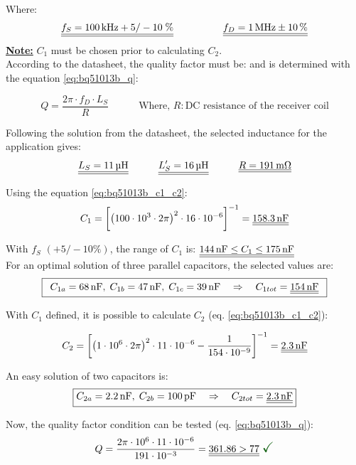 \documentclass[report.tex]{subfiles}
\begin{document}
Where:
$$
\begin{array}{l c r}
\underline{\underline{f_S= \SI{100}{\kilo\hertz} +5/-10 \; \si{\percent}}} & \quad \quad \quad & \underline{\underline{f_D = \SI{1}{\mega\hertz} \pm \SI{10}{\percent}}}
\end{array}
$$
\textbf{\underline{Note:}} $C_1$ must be chosen prior to calculating $C_2$.\\

According to the datasheet, the quality factor must be:  and is determined with the equation \ref{eq:bq51013b_q}:

\begin{equation}
\label{eq:bq51013b_q}
\boxed{Q = \dfrac{2 \pi \cdot f_D \cdot L_S}{R}}\quad \quad \quad \text{Where, } R:\text{DC resistance of the receiver coil}
\end{equation}

Following the solution from the datasheet, the selected inductance for the application gives:
$$
\ddl{L_S = \SI{11}{\micro\henry}} \quad\quad\quad \ddl{L_S' = \SI{16}{\micro\henry}} \quad\quad\quad \ddl{R = \SI{191}{\milli\ohm}}
$$

Using the equation \ref{eq:bq51013b_c1_c2}:
$$
C_1 = \bigg[ \big( 100\cdot 10^3 \cdot 2\pi \big)^2 \cdot 16\cdot 10^{-6} \bigg]^{-1} = \underline{\underline{\SI{158.3}{\nano\farad}}}
$$

With $f_S$ $(+5/-10\si{\percent})$, the range of $C_1$ is: $\underline{\underline{\SI{144}{\nano\farad}\leq C_1 \leq \SI{175}{\nano\farad}}}$\\

For an optimal solution of three parallel capacitors, the selected values are:
$$
\boxed{
\begin{array}{c}
C_{1a} = \SI{68}{\nano\farad}, \; C_{1b} = \SI{47}{\nano\farad}, \; C_{1c} = \SI{39}{\nano\farad} \quad \Rightarrow \quad C_{1tot} = \underline{\underline{\SI{154}{\nano\farad}}}
\end{array}}
$$

With $C_1$ defined, it is possible to calculate $C_2$ (eq. \ref{eq:bq51013b_c1_c2}):

$$
C_2 = \bigg[ \big( 1\cdot 10^6 \cdot 2\pi \big)^2 \cdot 11\cdot 10^{-6} - \dfrac{1}{154\cdot 10^{-9}} \bigg]^{-1} = \underline{\underline{\SI{2.3}{\nano\farad}}}
$$

An easy solution of two capacitors is:
$$
\boxed{C_{2a} = \SI{2.2}{\nano\farad}, \; C_{2b} = \SI{100}{\pico\farad} \quad \Rightarrow \quad C_{2tot} = \ddl{\SI{2.3}{\nano\farad}}}
$$

Now, the quality factor condition can be tested (eq. \ref{eq:bq51013b_q}):
$$
	Q = \dfrac{2\pi \cdot 10^6 \cdot 11\cdot 10^{-6}}{191\cdot 10^{-3}} = \ddl{361.86 > 77} \; \textcolor{mygreen}{\Large \checkmark}
$$
\end{document}
